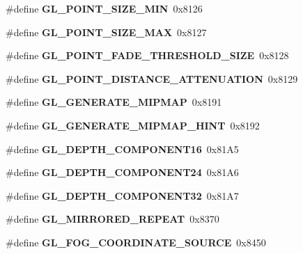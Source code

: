 \begin{DoxyCompactItemize}
\item 
\#define {\bfseries G\+L\+\_\+\+P\+O\+I\+N\+T\+\_\+\+S\+I\+Z\+E\+\_\+\+M\+I\+N}~0x8126\label{_s_d_l__opengl_8h_a1b40949a3039e44a2fb5e7a9a6ff6ded}

\item 
\#define {\bfseries G\+L\+\_\+\+P\+O\+I\+N\+T\+\_\+\+S\+I\+Z\+E\+\_\+\+M\+A\+X}~0x8127\label{_s_d_l__opengl_8h_a171aeb07c5b056c848d518caaec78bb6}

\item 
\#define {\bfseries G\+L\+\_\+\+P\+O\+I\+N\+T\+\_\+\+F\+A\+D\+E\+\_\+\+T\+H\+R\+E\+S\+H\+O\+L\+D\+\_\+\+S\+I\+Z\+E}~0x8128\label{_s_d_l__opengl_8h_aea5e5751981b4dbce199bef211d40c77}

\item 
\#define {\bfseries G\+L\+\_\+\+P\+O\+I\+N\+T\+\_\+\+D\+I\+S\+T\+A\+N\+C\+E\+\_\+\+A\+T\+T\+E\+N\+U\+A\+T\+I\+O\+N}~0x8129\label{_s_d_l__opengl_8h_a7ad856733e5bc9530270fb24d52e545b}

\item 
\#define {\bfseries G\+L\+\_\+\+G\+E\+N\+E\+R\+A\+T\+E\+\_\+\+M\+I\+P\+M\+A\+P}~0x8191\label{_s_d_l__opengl_8h_a8d7cd84f0b84e7a77585c8c695f6709f}

\item 
\#define {\bfseries G\+L\+\_\+\+G\+E\+N\+E\+R\+A\+T\+E\+\_\+\+M\+I\+P\+M\+A\+P\+\_\+\+H\+I\+N\+T}~0x8192\label{_s_d_l__opengl_8h_af9d67193f72c666cef8c676456f56a83}

\item 
\#define {\bfseries G\+L\+\_\+\+D\+E\+P\+T\+H\+\_\+\+C\+O\+M\+P\+O\+N\+E\+N\+T16}~0x81\+A5\label{_s_d_l__opengl_8h_a26b057c4fa415d8de41d43990828b0da}

\item 
\#define {\bfseries G\+L\+\_\+\+D\+E\+P\+T\+H\+\_\+\+C\+O\+M\+P\+O\+N\+E\+N\+T24}~0x81\+A6\label{_s_d_l__opengl_8h_ad871b289b8410082db98e4b3af0301f1}

\item 
\#define {\bfseries G\+L\+\_\+\+D\+E\+P\+T\+H\+\_\+\+C\+O\+M\+P\+O\+N\+E\+N\+T32}~0x81\+A7\label{_s_d_l__opengl_8h_a834857c13895c0375a5d2f4f0df7c7ad}

\item 
\#define {\bfseries G\+L\+\_\+\+M\+I\+R\+R\+O\+R\+E\+D\+\_\+\+R\+E\+P\+E\+A\+T}~0x8370\label{_s_d_l__opengl_8h_a05bc3a1fdd98251d126a8946a10f9dc8}

\item 
\#define {\bfseries G\+L\+\_\+\+F\+O\+G\+\_\+\+C\+O\+O\+R\+D\+I\+N\+A\+T\+E\+\_\+\+S\+O\+U\+R\+C\+E}~0x8450\label{_s_d_l__opengl_8h_ab8c54153bac17581605fafd9d973df33}


\end{DoxyCompactItemize}
